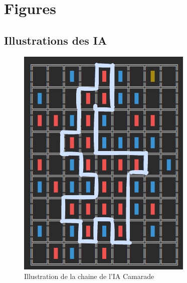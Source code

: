 \chapter{Figures}

\section{Illustrations des IA}
\begin{figure}[h]
    \centering
    \includegraphics[width=\textwidth,angle=0]{./images/Camarade.png}
    \caption{Illustration de la chaine de l'IA Camarade}
    \label{fig:cam1}
\end{figure}

